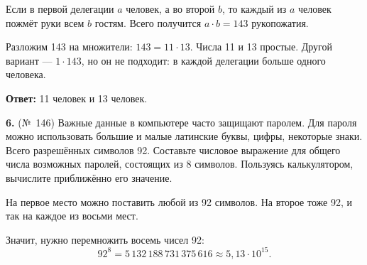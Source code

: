 \begin{solution}\label{solution-combinatorics-rules-homework-5}
Если в первой делегации $a$ человек, а во второй $b$, то каждый из $a$ человек пожмёт руки всем $b$ гостям. Всего получится $a\cdot b=143$ рукопожатия.

Разложим 143 на множители: $143=11\cdot13$. Числа 11 и 13 простые. Другой вариант — $1\cdot143$, но он не подходит: в каждой делегации больше одного человека.

\textbf{Ответ:} 11 человек и 13 человек.
\end{solution}

\begin{task}\label{task-homework-6}
\textbf{6.} (№ 146) Важные данные в компьютере часто защищают паролем. Для пароля можно использовать большие и малые латинские буквы, цифры, некоторые знаки. Всего разрешённых символов 92. Составьте числовое выражение для общего числа возможных паролей, состоящих из 8 символов. Пользуясь калькулятором, вычислите приближённо его значение.
\end{task}

\begin{solution}\label{solution-combinatorics-rules-homework-6}
На первое место можно поставить любой из 92 символов. На второе тоже 92, и так на каждое из восьми мест.

Значит, нужно перемножить восемь чисел 92:
\[
92^8=5\,132\,188\,731\,375\,616\approx5{,}13\cdot10^{15}.
\]
\end{solution}

